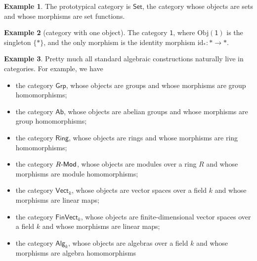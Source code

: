 \documentclass[a4paper]{report}
\newcommand{\Obj}{\mathrm{Obj}}
\def\mhyp{{\hbox{-}}}
\theoremstyle{definition}
\newtheorem{example}{Example}[section]
\theoremstyle{plain}
\theoremstyle{remark}
\begin{document}
\begin{example}
  The prototypical category is $\mathsf{Set}$, the category whose objects are sets and whose morphisms are set functions.  
\end{example}


\begin{example}[category with one object]
  \label{eg:categorywithoneobject}
  The category $\mathsf{1}$, where $\Obj(\mathsf{1})$ is the singleton $\{*\}$, and the only morphism is the identity morphism $\mathrm{id}_{*}\colon * \to *$.
\end{example}
\begin{example}
  \label{eg:examplesofcategories}
  Pretty much all standard algebraic constructions naturally live in categories. For example, we have 
  \begin{itemize} 
    \item the category $\mathsf{Grp}$, whose objects are groups and whose morphisms are group homomorphisms;

    \item \label{item:categoryab} the category $\mathsf{Ab}$, whose objects are abelian groups and whose morphisms are group homomorphisms;

    \item the category $\mathsf{Ring}$, whose objects are rings and whose morphisms are ring homomorphisms;

    \item the category $R\mhyp\mathsf{Mod}$, whose objects are modules over a ring $R$ and whose morphisms are module homomorphisms;

    \item the category $\mathsf{Vect}_{k}$, whose objects are vector spaces over a field $k$ and whose morphisms are linear maps;
    \item the category $\mathsf{FinVect}_{k}$, whose objects are finite-dimensional vector spaces over a field $k$ and whose morphisms are linear maps;
    \item the category $\mathsf{Alg}_{k}$, whose objects are algebras over a field $k$ and whose morphisms are algebra homomorphisms
  \end{itemize}
\end{example}
\end{document}
